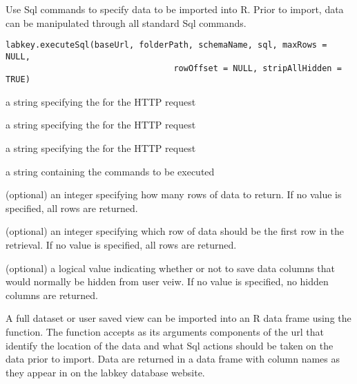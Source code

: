 \documentclass{article}
\begin{document}
\begin{Description}\relax
Use Sql commands to specify data to be imported into R. Prior to import, data can
be manipulated through all standard Sql commands.
\end{Description}
\begin{Usage}
\begin{verbatim}
labkey.executeSql(baseUrl, folderPath, schemaName, sql, maxRows = NULL, 
                                  rowOffset = NULL, stripAllHidden = TRUE)
\end{verbatim}
\end{Usage}
\begin{Arguments}
\begin{ldescription}
\item[\code{baseUrl}] a string specifying the for the HTTP request
\item[\code{folderPath}] a string specifying the  for the HTTP request
\item[\code{schemaName}] a string specifying the   for the HTTP request
\item[\code{sql}] a string containing the  commands to be executed
\item[\code{maxRows}] (optional) an integer specifying how many rows of data to return. If no value is specified, all rows are returned.
\item[\code{rowOffset}] (optional) an integer specifying which row of data should be the first row in the retrieval. 
If no value is specified, all rows are returned.
\item[\code{stripAllHidden}] (optional) a logical value indicating whether or not to save data columns that would 
normally be hidden from user veiw. If no value is specified, no hidden columns are returned.
\end{ldescription}
\end{Arguments}
\begin{Details}\relax
A full dataset or user saved view can be imported into an R data frame using the 
function. The function accepts as its arguments components of the url that identify the location of the
data and what Sql actions should be taken on the data prior to import. Data are returned in a data frame
with column names as they appear in on the labkey database website.
\end{Details}
\end{document}

